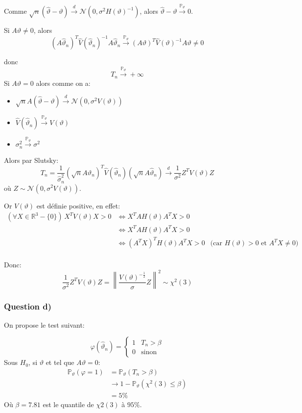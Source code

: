 \documentclass{article}
\newcommand{\BigF}[2]{\ensuremath{#1 \left(#2\right)}}
\newcommand{\Q}[1]{\subsubsection*{Question #1}}
\begin{document}
Comme $\sqrt n (\hat{\vartheta} - \vartheta)  \overset d \longrightarrow \BigF{\mathcal{N}}{0, \sigma^2 \BigF{H}{\vartheta}^{-1}}$, alors
$\hat{\vartheta} - \vartheta  \overset {\mathbb{P}_{\vartheta}} \longrightarrow 0$.

Si $A\vartheta \neq 0$, alors 
$$(A\hat \vartheta_n)^T \hat V (\hat \vartheta_n) ^{-1} A \hat \vartheta _n 
\overset {\mathbb{P}_{\vartheta}} \longrightarrow 
(A\vartheta)^T \hat V ( \vartheta) ^{-1} A  \vartheta \neq 0$$

donc $$T_n \overset {\mathbb{P}_{\vartheta}} \longrightarrow + \infty$$
Si $A\vartheta = 0$ alors comme on a:
\begin{itemize}
	\item  
	$\sqrt n A( \hat{\vartheta} - \vartheta ) \overset d \longrightarrow \BigF{\mathcal{N}}{0, \sigma^2 V( \vartheta )}$
	\item
	$ \hat{V}(\hat \vartheta_n ) \overset { \mathbb{P}_{\vartheta}}{ \longrightarrow} V( \vartheta )$
	\item
	$\sigma_n^2 \overset { \mathbb{P}_{\vartheta}}{ \longrightarrow} \sigma^2$
\end{itemize}
Alors par Slutsky:
$$ T_n = \frac{1}{\hat \sigma_n^2 } ( \sqrt n A \hat \vartheta _n)^T \hat{V}(\hat \vartheta_n ) ( \sqrt n A \hat \vartheta _n)
\overset d \longrightarrow \frac{1}{\sigma^2} Z^T V(\vartheta) Z $$
où $Z \sim \BigF{\mathcal{N}}{0, \sigma^2 V( \vartheta )}$.

Or $V( \vartheta )$ est définie positive, en effet:
\begin{align*}
(\forall X \in \mathbb{R}^3 - \{0\}) \, X^T V( \vartheta ) X > 0 
& \Leftrightarrow  X^T A H(\vartheta) A^T X > 0 \\
& \Leftrightarrow  X^T A H(\vartheta) A^T X > 0 \\
& \Leftrightarrow  (A^T X)^T H(\vartheta) A^T X > 0 & \text{(car $H(\vartheta) > 0$ et $A^T X \neq 0$)} \\
\end{align*}

Donc:
$$ \frac{1}{\sigma^2} Z^T V(\vartheta) Z = \left\| \frac{V(\vartheta)^{-\frac{1}{2}}}{\sigma} Z \right\|^2 \sim \chi^2(3) $$

\Q{d)}
On propose le test suivant:

$$
\varphi(\hat \vartheta _n) = \left\{
    \begin{array}{ll}
        1 & T_n > \beta \\
        0 & \mbox{sinon}
    \end{array}
\right.
$$
Sous \textbf{$H_0$}, si $\vartheta$ et tel que $A \vartheta  = 0$:
\begin{align*}
\mathbb{P}_\vartheta(\varphi = 1) 
&= \mathbb{P}_\vartheta(T_n > \beta ) \\
&  \to 1 - \mathbb{P}_\vartheta( \chi^2(3) \leq \beta ) \\
&= 5\%
\end{align*}
Où $\beta = 7.81$ est  le quantile de $\chi2(3)$ à $95\%$.
\end{document}
